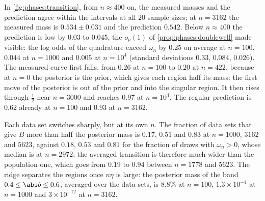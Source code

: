\begin{refsection}
In \cref{fig:phases:transition}, from $n\approx400$ on, the measured masses and the prediction agree within the intervals at all $20$ sample sizes; at $n=3162$ the measured mass is $0.534\pm0.031$ and the prediction $0.542$. Below $n\approx400$ the prediction is low by $0.03$ to $0.045$, the $o_p(1)$ of \cref{prop:phases:doublewell} made visible: the log odds of the quadrature exceed $\omega_n$ by $0.25$ on average at $n=100$, $0.044$ at $n=1000$ and $0.005$ at $n=10^4$ (standard deviations $0.33$, $0.084$, $0.026$). The measured curve first falls, from $0.26$ at $n=100$ to $0.20$ at $n=422$, because at $n=0$ the posterior is the prior, which gives each region half its mass: the first move of the posterior is out of the prior and into the singular region. It then rises through $\frac12$ near $n=3000$ and reaches $0.97$ at $n=10^4$. The regular prediction is $0.62$ already at $n=100$ and $0.93$ at $n=3162$.

Each data set switches sharply, but at its own $n$. The fraction of data sets that give $B$ more than half the posterior mass is $0.17$, $0.51$ and $0.83$ at $n=1000$, $3162$ and $5623$, against $0.18$, $0.53$ and $0.81$ for the fraction of draws with $\omega_n>0$, whose median is at $n=2972$; the averaged transition is therefore much wider than the population one, which goes from $0.19$ to $0.94$ between $n=1778$ and $5623$. The ridge separates the regions once $n\eta$ is large: the posterior mass of the band $0.4\le\abs b\le0.6$, averaged over the data sets, is $8.8\%$ at $n=100$, $1.3\times10^{-4}$ at $n=1000$ and $3\times10^{-12}$ at $n=3162$.


\end{refsection}
